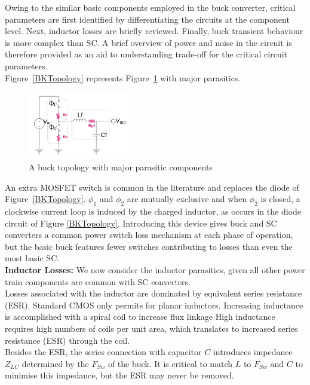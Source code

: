 \documentclass[letterpaper,twocolumn,10pt]{article}
\begin{document}
Owing to the similar basic components employed in the buck converter, critical parameters are first identified by differentiating the circuits at the component level. Next, inductor losses are briefly reviewed. Finally, buck transient behaviour is more complex than SC. A brief overview of power and noise in the circuit is therefore provided as an aid to understanding trade-off for the critical circuit parameters.\\
Figure~\ref{BKTopology} represents Figure~\ref{NonIdealBuckTopology} with major parasitics.\\
\begin{figure}[here]
\includegraphics[width=0.4\textwidth]{BuckTopologyParasitics}
\caption{A buck topology with major parasitic components}
\label{NonIdealBuckTopology}
\end{figure}
An extra MOSFET switch is common in the literature and replaces the diode of Figure~\ref{BKTopology}. $\phi_1$ and $\phi_2$ are mutually exclusive and when $\phi_2$ is closed, a clockwise current loop is induced by the charged inductor, as occurs in the diode circuit of Figure \ref{BKTopology}. Introducing this device gives buck and SC converters a common power switch loss mechanism at each phase of operation, but the basic buck features fewer switches contributing to losses than even the most basic SC.\\
\textbf{Inductor Losses: }We now consider the inductor parasitics, given all other power train components are common with SC converters.\\
Losses associated with the inductor are dominated by equivalent series resistance (ESR). Standard CMOS only permits for planar inductors. Increasing inductance is accomplished with a spiral coil to increase flux linkage High inductance requires high numbers of coils per unit area, which translates to increased series resistance (ESR) through the coil.\\
Besides the ESR, the series connection with capacitor $C$ introduces impedance $Z_{LC}$ determined by the $F_{Sw}$ of the buck. It is critical to match $L$ to $F_{Sw}$ and $C$ to minimise this impedance, but the ESR may never be removed.\\  
\end{document}
